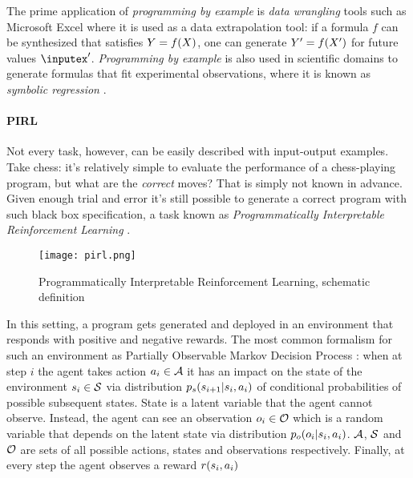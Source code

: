 The prime application of \emph{programming by example} is \emph{data wrangling} tools such as Microsoft Excel \cite{gulwaniProgrammingExamplesandIts2016} where it is used as a data extrapolation tool: if a formula $f$ can be synthesized that satisfies $Y=f(X)$, one can generate $Y'=f(X')$ for future values $\inputex'$.
\emph{Programming by example} is also used in scientific domains to generate formulas that fit experimental observations, where it is known as \emph{symbolic regression} \cite{makkeInterpretableScientificDiscovery2022}.

\paragraph{PIRL}

Not every task, however, can be easily described with input-output examples. 
Take chess: it's relatively simple to evaluate the performance of a chess-playing program, but what are the \emph{correct} moves? 
That is simply not known in advance.
Given enough trial and error it's still possible to generate a correct program with such black box specification, a task known as \emph{Programmatically Interpretable Reinforcement Learning} \cite{pirl}.

\begin{figure}[H]
    \centering
    \texttt{[image: pirl.png]}
    \caption{Programmatically Interpretable Reinforcement Learning, schematic definition}
    \label{fig:pirl}
\end{figure}

In this setting, a program gets generated and deployed in an environment that responds with positive and negative rewards. 
The most common formalism for such an environment as Partially Observable Markov Decision Process \cite{kramerjdavidrPartiallyObservableMarkov1964, spaanPartiallyObservableMarkov2012}: when at step $i$ the agent takes action $a_i \in \mathcal{A}$ it has an impact on  the state of the environment $s_i \in \mathcal{S}$ via distribution $p_s(s_{i+1} | s_i, a_i)$ of conditional probabilities of possible subsequent states. 
State is a latent variable that the agent cannot observe.
Instead, the agent can see an observation $o_i \in \mathcal{O}$ which is a random variable that depends on the latent state via distribution $p_o(o_i | s_i, a_i)$.
$\mathcal{A}$, $\mathcal{S}$ and $\mathcal{O}$ are sets of all possible actions, states and observations respectively.
Finally, at every step the agent observes a reward $r(s_i,a_i)$

